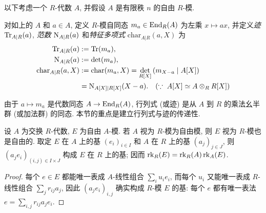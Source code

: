 以下考虑一个 $R$-代数 $A$, 并假设 $A$ 是有限秩 $n$ 的自由 $R$-模.
\begin{definition}\label{def:norm-trace}  
	对如上的 $A$ 和 $a \in A$, 定义 $R$-模自同态 $m_a \in \operatorname{End}_R(A)$ 为左乘 $x \mapsto ax$, 并定义\emph{迹} $\operatorname{Tr}_{A|R}(a)$, \emph{范数} $\operatorname{N}_{A|R}(a)$ 和\emph{特征多项式} $\mathrm{char}_{A|R}(a, X)$ 为
	\begin{align*}
		\operatorname{Tr}_{A|R}(a) & := \operatorname{Tr}(m_a), \\
		\operatorname{N}_{A|R}(a) & := \det(m_a), \\
		\mathrm{char}_{A|R}(a, X) & := \mathrm{char}(m_a, X) = \det_{R[X]}\left( m_{X-a} \mid A[X] \right) \\
		& = \operatorname{N}_{A[X]|R[X]}(X-a). \quad (\because\; A[X] \simeq A \otimes_R R[X])
	\end{align*}
\end{definition}
由于 $a \mapsto m_a$ 是代数同态 $A \to \operatorname{End}_R(A)$, 行列式 (或迹) 是从 $A$ 到 $R$ 的乘法幺半群 (或加法群) 的同态. 本节的重点是建立行列式与迹的传递性.

\begin{lemma}\label{prop:free-transitivity}
	设 $A$ 为交换 $R$-代数, $E$ 为自由 $A$-模. 若 $A$ 视为 $R$-模为自由模, 则 $E$ 视为 $R$-模也是自由的. 取定 $E$ 在 $A$ 上的基 $(e_i)_{i \in I}$ 和 $A$ 在 $R$ 上的基 $(a_j)_{j \in J}$, 则 $(a_j e_i)_{(i,j) \in I \times J}$ 构成 $E$ 在 $R$ 上的基; 因而 $\operatorname{rk}_R(E) = \operatorname{rk}_R(A) \operatorname{rk}_A(E)$.
\end{lemma}
\begin{proof}
	每个 $e \in E$ 都能唯一表成 $A$-线性组合 $\sum_i u_i e_i$, 而每个 $u_i$ 又能唯一表成 $R$-线性组合 $\sum_j r_{ij} a_j$, 因此 $(a_j e_i)_{i,j}$ 确实构成 $R$-模 $E$ 的基: 每个 $e$ 都有唯一表法 $e = \sum_{i,j} r_{ij} a_j e_i$.
\end{proof}

